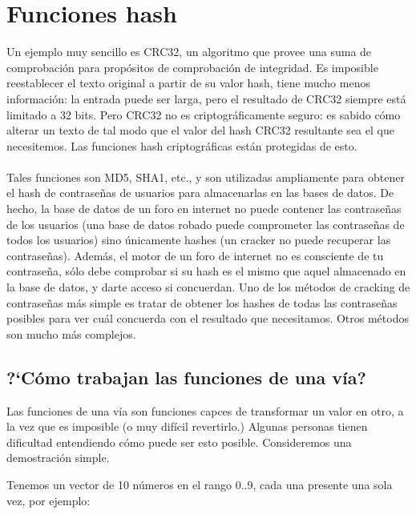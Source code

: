﻿\newcommand{\HashFuncChapterName}{Funciones hash}

\section{\HashFuncChapterName}
\label{hash_func}

\myindex{\HashFuncChapterName}
Un ejemplo muy sencillo es CRC32, un algoritmo que provee una  suma de
comprobaci\'on para prop\'ositos de comprobaci\'on de integridad.
Es imposible reestablecer el texto original a partir de su valor hash, tiene mucho menos informaci\'on:
la entrada puede ser larga, pero el resultado de CRC32 siempre est\'a limitado a 32 bits.
Pero CRC32 no es criptogr\'aficamente seguro: es sabido c\'omo alterar un texto de tal modo que el valor
del hash CRC32 resultante sea el que necesitemos.
Las funciones hash criptogr\'aficas est\'an protegidas de esto. \\
\\
Tales funciones son MD5, SHA1, etc., y son utilizadas ampliamente para obtener el hash de contrase\~nas de usuarios para
almacenarlas en las bases de datos.
De hecho, la base de datos de un foro en internet no puede contener las contrase\~nas de los usuarios
(una base de datos robado puede comprometer las contrase\~nas de todos los usuarios) sino \'unicamente
hashes (un cracker no puede recuperar las contrase\~nas).
Adem\'as, el motor de un foro de internet no es consciente de tu contrase\~na, s\'olo debe comprobar
si su hash es el mismo que aquel almacenado en la base de datos, y darte acceso si concuerdan.
Uno de los m\'etodos de cracking de contrase\~nas m\'as simple es tratar de obtener los hashes de todas
las contrase\~nas posibles para ver cu\'al concuerda con el resultado que necesitamos.
Otros m\'etodos son mucho m\'as complejos.

\subsection{?`C\'omo trabajan las funciones de una v\'ia?}

Las funciones de una v\'ia son funciones capces de transformar un valor en otro,
a la vez que es imposible (o muy dif\'icil revertirlo.)
Algunas personas tienen dificultad entendiendo c\'omo puede ser esto posible.
Consideremos una demostraci\'on simple.

Tenemos un vector de 10 n\'umeros en el rango 0..9, cada una presente una sola vez, por ejemplo:

